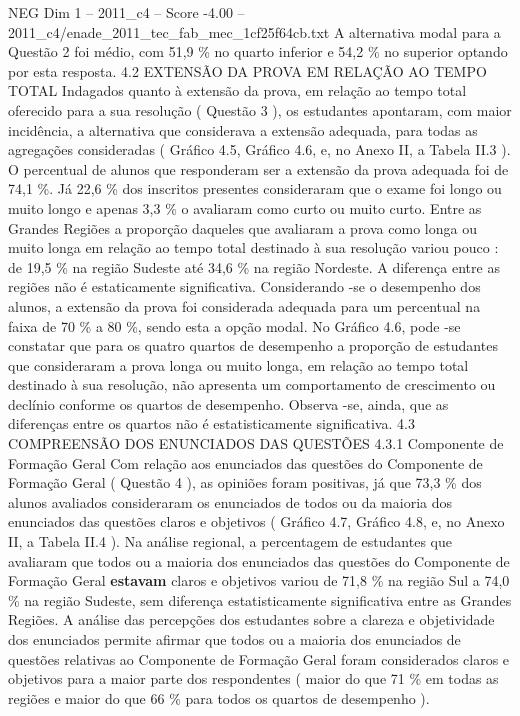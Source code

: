 \begin{textsample}{NEG Dim 1 – 2011\_c4 – Score -4.00 – 2011\_c4/enade\_2011\_tec\_fab\_mec\_1cf25f64cb.txt}
A alternativa modal para a Questão 2 foi médio, com 51,9 \% no quarto inferior e 54,2 \% no superior optando por esta resposta. 4.2 EXTENSÃO DA PROVA EM RELAÇÃO AO TEMPO TOTAL Indagados quanto à extensão da prova, em relação ao tempo total oferecido para a sua resolução ( Questão 3 ), os estudantes apontaram, com maior incidência, a alternativa que considerava a extensão adequada, para todas as agregações consideradas ( Gráfico 4.5, Gráfico 4.6, e, no Anexo II, a Tabela II.3 ).
O percentual de alunos que responderam ser a extensão da prova adequada foi de 74,1 \%.
Já 22,6 \% dos inscritos presentes consideraram que o exame foi longo ou muito longo e apenas 3,3 \% o avaliaram como curto ou muito curto.
Entre as Grandes Regiões a proporção daqueles que avaliaram a prova como longa ou muito longa em relação ao tempo total destinado à sua resolução variou pouco : de 19,5 \% na região Sudeste até 34,6 \% na região Nordeste.
A diferença entre as regiões não é estaticamente significativa.
Considerando -se o desempenho dos alunos, a extensão da prova foi considerada adequada para um percentual na faixa de 70 \% a 80 \%, sendo esta a opção modal.
No Gráfico 4.6, pode -se constatar que para os quatro quartos de desempenho a proporção de estudantes que consideraram a prova longa ou muito longa, em relação ao tempo total destinado à sua resolução, não apresenta um comportamento de crescimento ou declínio conforme os quartos de desempenho.
Observa -se, ainda, que as diferenças entre os quartos não é estatisticamente significativa. 4.3 COMPREENSÃO DOS ENUNCIADOS DAS QUESTÕES 4.3.1 Componente de Formação Geral Com relação aos enunciados das questões do Componente de Formação Geral ( Questão 4 ), as opiniões foram positivas, já que 73,3 \% dos alunos avaliados consideraram os enunciados de todos ou da maioria dos enunciados das questões claros e objetivos ( Gráfico 4.7, Gráfico 4.8, e, no Anexo II, a Tabela II.4 ).
Na análise regional, a percentagem de estudantes que avaliaram que todos ou a maioria dos enunciados das questões do Componente de Formação Geral \textbf{estavam} claros e objetivos variou de 71,8 \% na região Sul a 74,0 \% na região Sudeste, sem diferença estatisticamente significativa entre as Grandes Regiões.
A análise das percepções dos estudantes sobre a clareza e objetividade dos enunciados permite afirmar que todos ou a maioria dos enunciados de questões relativas ao Componente de Formação Geral foram considerados claros e objetivos para a maior parte dos respondentes ( maior do que 71 \% em todas as regiões e maior do que 66 \% para todos os quartos de desempenho ).

\end{textsample}
